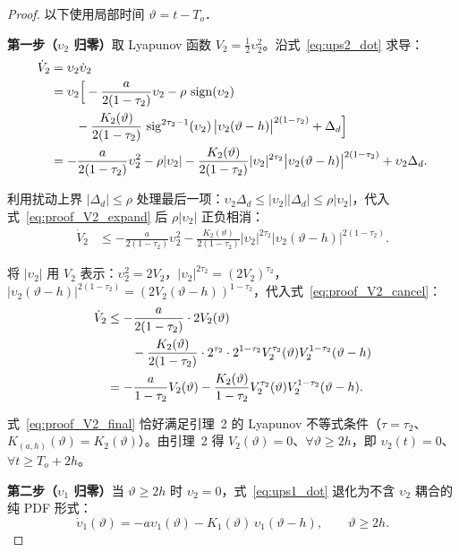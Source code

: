 \documentclass[12pt,a4paper]{article}
\theoremstyle{definition}
\theoremstyle{remark}
\newcommand{\sign}{\operatorname{sign}}
\newcommand{\sig}{\operatorname{sig}}
\newcommand{\vi}{\upsilon}
\newcommand{\vth}{\vartheta}
\begin{document}
\begin{proof}
以下使用局部时间 $\vth=t-T_o$．

\textbf{第一步（$\vi_2$ 归零）}取 Lyapunov 函数 $V_2=\frac12\vi_2^2$。沿式~\eqref{eq:ups2_dot} 求导：
\begin{align}
  \dot V_2 &= \vi_2\dot\vi_2 \notag\\
  &= \vi_2\Big[-\frac{a}{2(1-\tau_2)}\vi_2-\rho\,\sign(\vi_2)\\
  &\qquad -\frac{K_2(\vth)}{2(1-\tau_2)}\,\sig^{2\tau_2-1}(\vi_2)\,
      \big|\vi_2(\vth-h)\big|^{2(1-\tau_2)}+\Delta_d\Big] \notag\\
  &= -\frac{a}{2(1-\tau_2)}\vi_2^2-\rho|\vi_2| -\frac{K_2(\vth)}{2(1-\tau_2)}|\vi_2|^{2\tau_2}
    \big|\vi_2(\vth-h)\big|^{2(1-\tau_2)}+\vi_2\Delta_d . \label{eq:proof_V2_expand}
\end{align}

利用扰动上界 $|\Delta_d|\le\rho$ 处理最后一项：$\vi_2\Delta_d\le|\vi_2||\Delta_d|\le\rho|\vi_2|$，代入式~\eqref{eq:proof_V2_expand} 后 $\rho|\vi_2|$ 正负相消：
\begin{align}
  \dot V_2 &\le -\frac{a}{2(1-\tau_2)}\vi_2^2 -\frac{K_2(\vth)}{2(1-\tau_2)}|\vi_2|^{2\tau_2}
    \big|\vi_2(\vth-h)\big|^{2(1-\tau_2)} . \label{eq:proof_V2_cancel}
\end{align}

将 $|\vi_2|$ 用 $V_2$ 表示：$\vi_2^2=2V_2$，$|\vi_2|^{2\tau_2}=(2V_2)^{\tau_2}$，$|\vi_2(\vth-h)|^{2(1-\tau_2)}=(2V_2(\vth-h))^{1-\tau_2}$，代入式~\eqref{eq:proof_V2_cancel}：
\begin{align}
  \dot V_2 &\le -\frac{a}{2(1-\tau_2)}\cdot 2V_2(\vth)\\
  &\qquad -\frac{K_2(\vth)}{2(1-\tau_2)}\cdot 2^{\tau_2}\cdot 2^{1-\tau_2}
    V_2^{\tau_2}(\vth)V_2^{1-\tau_2}(\vth-h) \notag\\
  &= -\frac{a}{1-\tau_2}V_2(\vth)-\frac{K_2(\vth)}{1-\tau_2}
    V_2^{\tau_2}(\vth)V_2^{1-\tau_2}(\vth-h) . \label{eq:proof_V2_final}
\end{align}

式~\eqref{eq:proof_V2_final} 恰好满足引理~2 的 Lyapunov 不等式条件（$\tau=\tau_2$、$K_{(a,h)}(\vth)=K_2(\vth)$）。由引理~2 得 $V_2(\vth)=0$、$\forall\vth\ge 2h$，即 $\vi_2(t)=0$、$\forall t\ge T_o+2h$。

\textbf{第二步（$\vi_1$ 归零）}当 $\vth\ge 2h$ 时 $\vi_2=0$，式~\eqref{eq:ups1_dot} 退化为不含 $\vi_2$ 耦合的纯 PDF 形式：
\begin{equation}
  \dot\vi_1(\vth)=-a\vi_1(\vth)-K_1(\vth)\,\vi_1(\vth-h),
  \qquad \vth\ge 2h . \label{eq:proof_v1_reduced}
\end{equation}


\end{proof}
\end{document}
